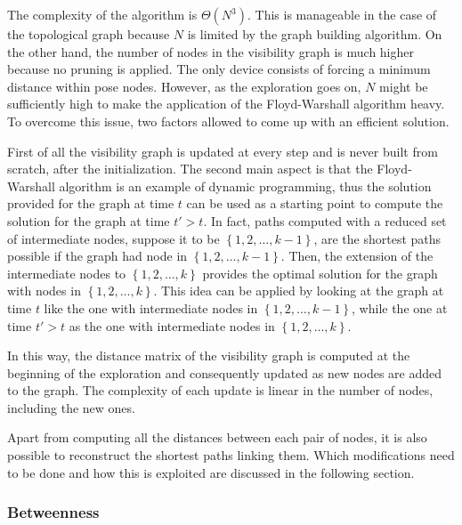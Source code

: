 The complexity of the algorithm is $\Theta\left(N^{3}\right)$. This
is manageable in the case of the topological graph because $N$ is
limited by the graph building algorithm. On the other hand, the number
of nodes in the visibility graph is much higher because no pruning
is applied. The only device consists of forcing a minimum distance
within pose nodes. However, as the exploration goes on, $N$ might
be sufficiently high to make the application of the Floyd-Warshall
algorithm heavy. To overcome this issue, two factors allowed to come
up with an efficient solution. 

First of all the visibility graph is updated at every step and is
never built from scratch, after the initialization. The second main
aspect is that the Floyd-Warshall algorithm is an example of dynamic
programming, thus the solution provided for the graph at time $t$
can be used as a starting point to compute the solution for the graph
at time $t'>t$. In fact, paths computed with a reduced set of intermediate
nodes, suppose it to be $\left\{ 1,2,\ldots,k-1\right\} $, are the
shortest paths possible if the graph had node in $\left\{ 1,2,\ldots,k-1\right\} $.
Then, the extension of the intermediate nodes to $\left\{ 1,2,\ldots,k\right\} $
provides the optimal solution for the graph with nodes in $\left\{ 1,2,\ldots,k\right\} $.
This idea can be applied by looking at the graph at time $t$ like
the one with intermediate nodes in $\left\{ 1,2,\ldots,k-1\right\} $,
while the one at time $t'>t$ as the one with intermediate nodes in
$\left\{ 1,2,\ldots,k\right\} $. 

In this way, the distance matrix of the visibility graph is computed
at the beginning of the exploration and consequently updated as new
nodes are added to the graph. The complexity of each update is linear
in the number of nodes, including the new ones. 

Apart from computing all the distances between each pair of nodes,
it is also possible to reconstruct the shortest paths linking them.
Which modifications need to be done and how this is exploited are
discussed in the following section.

\subsubsection{Betweenness}

